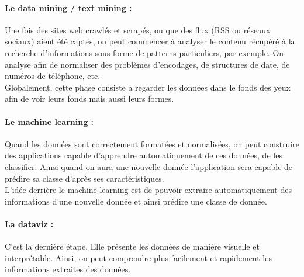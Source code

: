             \color{red}

            \paragraph{Le data mining / text mining :}
                Une fois des sites web crawlés et scrapés, ou que des flux (RSS ou réseaux sociaux) aient été captés, on peut commencer à analyser le contenu récupéré à la recherche d'informations sous forme de patterns particuliers, par exemple. On analyse afin de normaliser des problèmes d'encodages, de structures de date, de numéros de téléphone, etc.\\
                Globalement, cette phase consiste à regarder les données \og dans le fonds des yeux \fg \autocite{steph_canu} afin de voir leurs fonds mais aussi leurs formes.

            \paragraph{Le machine learning :}
                Quand les données sont correctement formatées et normalisées, on peut construire des applications capable d'apprendre automatiquement de ces données, de les classifier. Ainsi quand on aura une nouvelle donnée l'application sera capable de prédire sa classe d'après ses caractéristiques.\\
                L'idée derrière le machine learning est de pouvoir extraire automatiquement des informations d'une nouvelle donnée et ainsi prédire une classe de donnée.

            \paragraph{La dataviz :}
                C'est la dernière étape. Elle présente les données de manière visuelle et interprétable. Ainsi, on peut comprendre plus facilement et rapidement les informations extraites des données.


